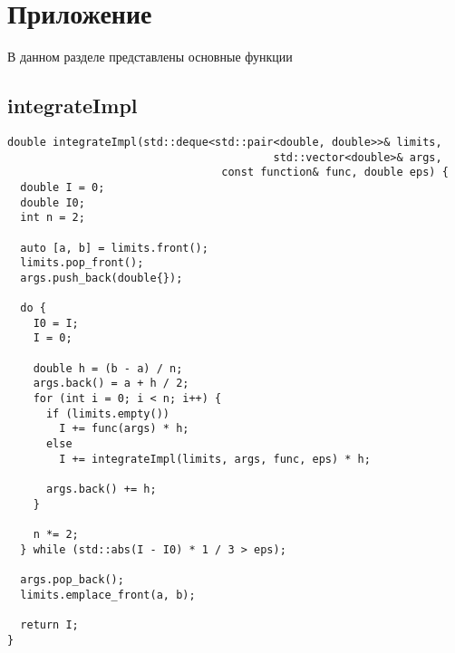 \documentclass[12pt]{article}
\begin{document}
\newpage
\section{Приложение}

В данном разделе представлены основные функции

\subsection{integrateImpl}
\begin{verbatim}
double integrateImpl(std::deque<std::pair<double, double>>& limits,
                                         std::vector<double>& args,
                                 const function& func, double eps) {
  double I = 0;
  double I0;
  int n = 2;

  auto [a, b] = limits.front();
  limits.pop_front();
  args.push_back(double{});

  do {
    I0 = I;
    I = 0;

    double h = (b - a) / n;
    args.back() = a + h / 2;
    for (int i = 0; i < n; i++) {
      if (limits.empty())
        I += func(args) * h;
      else
        I += integrateImpl(limits, args, func, eps) * h;

      args.back() += h;
    }

    n *= 2;
  } while (std::abs(I - I0) * 1 / 3 > eps);

  args.pop_back();
  limits.emplace_front(a, b);

  return I;
}
\end{verbatim}
\newpage
\end{document}
